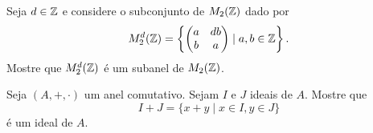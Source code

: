 \documentclass[12pt]{exam}
\begin{document}
\questao{} Seja $d \in \mathbb{Z}$ e considere o subconjunto de $M_2(\mathbb{Z})$ dado por
    \[
        M_2^d(\mathbb{Z}) = \left\{\begin{pmatrix} a & db \\ b & a \end{pmatrix} \mid a, b \in \mathbb{Z}\right\}.
    \]
    Mostre que $M_2^d(\mathbb{Z})$ é um subanel de $M_2(\mathbb{Z})$.

\vspace{1cm}

\questao{} Seja $(A, +, \cdot)$ um anel comutativo. Sejam $I$ e $J$ ideais de $A$. Mostre que
    \[
        I + J = \{x + y \mid x \in I, y \in J\}
    \]
    \'e um ideal de $A$.
\end{document}

